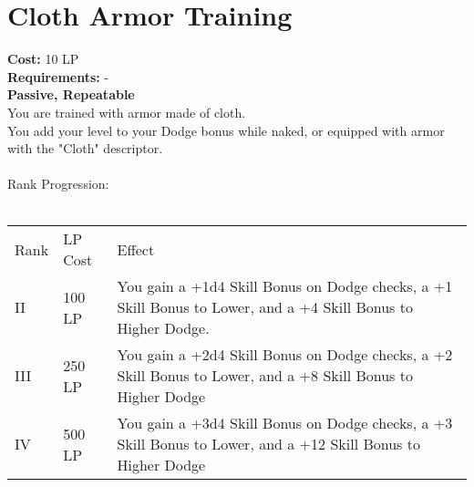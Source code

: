 \section{Cloth Armor Training}\label{perk:clothArmorTraining}
\textbf{Cost:} 10 LP\\
\textbf{Requirements:} -\\
\textbf{Passive, Repeatable}\\
You are trained with armor made of cloth.\\
You add your level to your Dodge bonus while naked, or equipped with armor with the "Cloth" descriptor.\\
\\

Rank Progression:\\
\\
\begin{longtable}{l | l | p{9cm}}
	Rank & LP Cost & Effect\\
	II & 100 LP & You gain a +1d4 Skill Bonus on Dodge checks, a +1 Skill Bonus to Lower, and a +4 Skill Bonus to Higher Dodge.\\
	III & 250 LP & You gain a +2d4 Skill Bonus on Dodge checks, a +2 Skill Bonus to Lower, and a +8 Skill Bonus to Higher Dodge\\
	IV & 500 LP & You gain a +3d4 Skill Bonus on Dodge checks, a +3 Skill Bonus to Lower, and a +12 Skill Bonus to Higher Dodge\\
\end{longtable}